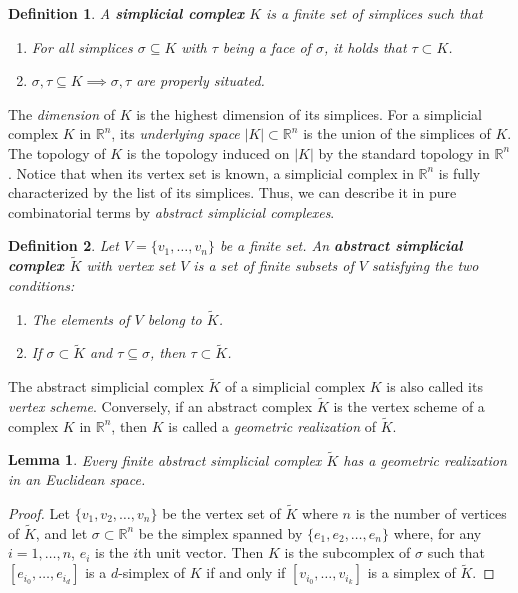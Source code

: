 \documentclass{article}
\newtheorem*{definition}{Definition}
\newtheorem*{lemma}{Lemma}
\begin{document}
\begin{definition}
A \textbf{simplicial complex} $K$ is a finite set of simplices such that
\begin{enumerate}
	\item For all simplices $\sigma \subseteq K$ with $\tau$ being a face of $\sigma$, it holds that $\tau \subset K$.
	\item $\sigma, \tau \subseteq K \implies \sigma, \tau$ are properly situated.
\end{enumerate}
\end{definition}

The \emph{dimension} of $K$ is the highest dimension of its simplices. For a simplicial complex $K$ in $\mathbb{R}^n$, its \emph{underlying space} $\vert K \vert \subset \mathbb{R}^n$ is the union of the simplices of $K$. The topology of $K$ is the topology induced on $\vert K \vert$ by the standard topology in $\mathbb{R}^n$. Notice that when its vertex set is known, a simplicial complex in $\mathbb{R}^n$ is fully characterized by the list of its simplices. Thus, we can describe it in pure combinatorial terms by \emph{abstract simplicial complexes}.

\begin{definition}
Let $V = \{v_1, \ldots, v_n\}$ be a finite set. An \textbf{abstract simplicial complex $\tilde{K}$} with vertex set $V$ is a set of finite subsets of $V$ satisfying the two conditions:
\begin{enumerate}
	\item The elements of $V$ belong to $\tilde{K}$.
	\item If $\sigma \subset \tilde{K}$ and $\tau \subseteq \sigma$, then $\tau \subset \tilde{K}$.
\end{enumerate}
\end{definition}

The abstract simplicial complex $\tilde{K}$ of a simplicial complex $K$ is also called its \emph{vertex scheme}. Conversely, if an abstract complex $\tilde{K}$ is the vertex scheme of a complex $K$ in $\mathbb{R}^n$, then $K$ is called a \emph{geometric realization} of $\tilde{K}$.

\begin{lemma}
Every finite abstract simplicial complex $\tilde{K}$ has a geometric realization in an Euclidean space.
\end{lemma}

\begin{proof}
Let $\{v_1,v_2, \ldots, v_n\}$ be the vertex set of $\tilde{K}$ where $n$ is the number of vertices of $\tilde{K}$, and let $\sigma \subset \mathbb{R}^n$ be the simplex spanned by $\{e_1, e_2, \ldots, e_n\}$ where, for any $i = 1, \ldots, n$, $e_i$ is the $i$th unit vector. Then $K$ is the subcomplex of $\sigma$ such that $[e_{i_0}, \ldots, e_{i_d}]$ is a $d$-simplex of $K$ if and only if $[v_{i_0}, \ldots, v_{i_k}]$ is a simplex of $\tilde{K}$.
\end{proof}
\end{document}
